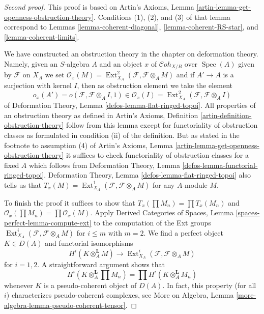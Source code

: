 \documentclass{stacks-project}
\theoremstyle{plain}
\theoremstyle{definition}
\theoremstyle{remark}
\numberwithin{equation}{subsection}
\def\Spec{\mathop{\mathrm{Spec}}}
\def\Ext{\mathop{\mathrm{Ext}}\nolimits}
\def\Cohstack{\mathcal{C}\!\mathit{oh}}
\begin{document}
\begin{proof}[Second proof]
This proof is based on
Artin's Axioms, Lemma \ref{artin-lemma-get-openness-obstruction-theory}.
Conditions (1), (2), and (3) of that lemma correspond to
Lemmas \ref{lemma-coherent-diagonal},
\ref{lemma-coherent-RS-star}, and
\ref{lemma-coherent-limits}.

\medskip\noindent
We have constructed an obstruction theory in the chapter on
deformation theory. Namely, given an $S$-algebra $A$ and an
object $x$ of $\Cohstack_{X/B}$ over $\Spec(A)$ given
by $\mathcal{F}$ on $X_A$ we set
$\mathcal{O}_x(M) = \Ext^2_{X_A}(\mathcal{F}, \mathcal{F} \otimes_A M)$
and if $A' \to A$ is a surjection with kernel $I$, then as obstruction
element we take the element
$$
o_x(A') = o(\mathcal{F}, \mathcal{F} \otimes_A I, 1) \in
\mathcal{O}_x(I) = \Ext^2_{X_A}(\mathcal{F}, \mathcal{F} \otimes_A I)
$$
of Deformation Theory, Lemma \ref{defos-lemma-flat-ringed-topoi}.
All properties of an obstruction theory as defined in
Artin's Axioms, Definition \ref{artin-definition-obstruction-theory}
follow from this lemma except for functoriality of obstruction classes
as formulated in condition (ii) of the definition. But as stated in
the footnote to assumption (4) of
Artin's Axioms, Lemma \ref{artin-lemma-get-openness-obstruction-theory}
it suffices to check functoriality of obstruction classes
for a fixed $A$ which follows from
Deformation Theory, Lemma \ref{defos-lemma-functorial-ringed-topoi}.
Deformation Theory, Lemma \ref{defos-lemma-flat-ringed-topoi}
also tells us that
$T_x(M) = \Ext^1_{X_A}(\mathcal{F}, \mathcal{F} \otimes_A M)$
for any $A$-module $M$.

\medskip\noindent
To finish the proof it suffices to show that
$T_x(\prod M_n) = \prod T_x(M_n)$ and
$\mathcal{O}_x(\prod M_n) = \prod \mathcal{O}_x(M)$.
Apply Derived Categories of Spaces, Lemma
\ref{spaces-perfect-lemma-compute-ext}
to the computation of the Ext groups
$\Ext^i_{X_A}(\mathcal{F}, \mathcal{F} \otimes_A M)$
for $i \leq m$ with $m = 2$. We find a perfect object $K \in D(A)$
and functorial isomorphisms
$$
H^i(K \otimes_A^\mathbf{L} M)
\longrightarrow
\Ext^i_{X_A}(\mathcal{F}, \mathcal{F} \otimes_A M)
$$
for $i = 1, 2$. A straightforward argument shows that
$$
H^i(K \otimes_A^\mathbf{L} \prod M_n) =
\prod H^i(K \otimes_A^\mathbf{L} M_n)
$$
whenever $K$ is a pseudo-coherent object of $D(A)$.
In fact, this property (for all $i$) characterizes
pseudo-coherent complexes, see
More on Algebra, Lemma \ref{more-algebra-lemma-pseudo-coherent-tensor}.
\end{proof}
\end{document}
